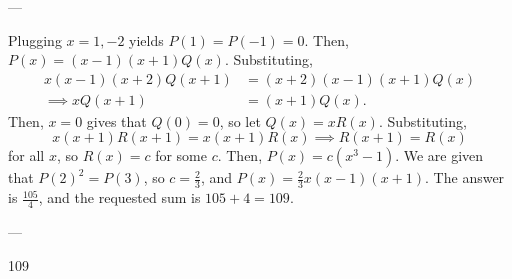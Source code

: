 
---

Plugging $x=1,-2$ yields $P(1)=P(-1)=0$. Then, $P(x)=(x-1)(x+1)Q(x)$. Substituting,
\begin{align*}
    x(x-1)(x+2)Q(x+1)&=(x+2)(x-1)(x+1)Q(x)\\
    \implies xQ(x+1)&=(x+1)Q(x).
\end{align*}
Then, $x=0$ gives that $Q(0)=0$, so let $Q(x)=xR(x)$. Substituting, \[x(x+1)R(x+1)=x(x+1)R(x)\implies R(x+1)=R(x)\]
for all $x$, so $R(x)=c$ for some $c$. Then, $P(x)=c(x^3-1)$. We are given that $P(2)^2=P(3)$, so $c=\tfrac23$, and $P(x)=\tfrac23x(x-1)(x+1)$. The answer is $\frac{105}4$, and the requested sum is $105+4=109$.

---

109
